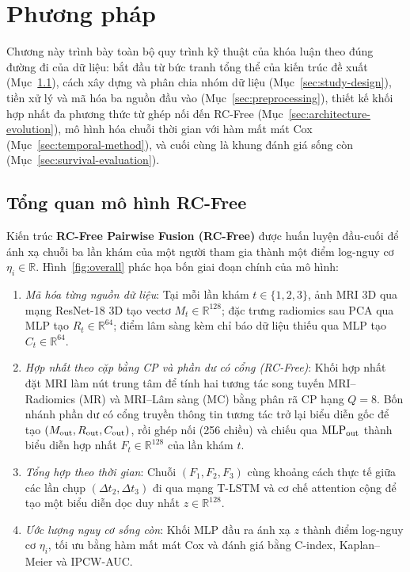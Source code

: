\chapter{Phương pháp}
\label{chap:method}

Chương này trình bày toàn bộ quy trình kỹ thuật của khóa luận theo đúng đường đi của dữ liệu: bắt đầu từ bức tranh tổng thể của kiến trúc đề xuất (Mục~\ref{sec:final-pipeline}), cách xây dựng và phân chia nhóm dữ liệu (Mục~\ref{sec:study-design}), tiền xử lý và mã hóa ba nguồn đầu vào (Mục~\ref{sec:preprocessing}), thiết kế khối hợp nhất đa phương thức từ ghép nối đến RC-Free (Mục~\ref{sec:architecture-evolution}), mô hình hóa chuỗi thời gian với hàm mất mát Cox (Mục~\ref{sec:temporal-method}), và cuối cùng là khung đánh giá sống còn (Mục~\ref{sec:survival-evaluation}).

\section{Tổng quan mô hình RC-Free}
\label{sec:final-pipeline}
Kiến trúc \textbf{RC-Free Pairwise Fusion (RC-Free)} được huấn luyện đầu-cuối để ánh xạ chuỗi ba lần khám của một người tham gia thành một điểm log-nguy cơ $\eta_i \in \mathbb R$. Hình~\ref{fig:overall} phác họa bốn giai đoạn chính của mô hình:
\begin{enumerate}
\item \emph{Mã hóa từng nguồn dữ liệu}: Tại mỗi lần khám $t\in\{1,2,3\}$, ảnh MRI 3D qua mạng ResNet-18 3D tạo vectơ $M_t\in\mathbb R^{128}$; đặc trưng radiomics sau PCA qua MLP tạo $R_t\in\mathbb R^{64}$; điểm lâm sàng kèm chỉ báo dữ liệu thiếu qua MLP tạo $C_t\in\mathbb R^{64}$.
\item \emph{Hợp nhất theo cặp bằng CP và phần dư có cổng (RC-Free)}: Khối hợp nhất đặt MRI làm nút trung tâm để tính hai tương tác song tuyến MRI--Radiomics (MR) và MRI--Lâm sàng (MC) bằng phân rã CP hạng $Q=8$. Bốn nhánh phần dư có cổng truyền thông tin tương tác trở lại biểu diễn gốc để tạo $(M_{\rm out}, R_{\rm out}, C_{\rm out})$, rồi ghép nối (256 chiều) và chiếu qua $\operatorname{MLP}_{\rm out}$ thành biểu diễn hợp nhất $F_t\in\mathbb R^{128}$ của lần khám $t$.
\item \emph{Tổng hợp theo thời gian}: Chuỗi $(F_1, F_2, F_3)$ cùng khoảng cách thực tế giữa các lần chụp $(\Delta t_2, \Delta t_3)$ đi qua mạng T-LSTM và cơ chế attention cộng để tạo một biểu diễn dọc duy nhất $z\in\mathbb R^{128}$.
\item \emph{Ước lượng nguy cơ sống còn}: Khối MLP đầu ra ánh xạ $z$ thành điểm log-nguy cơ $\eta_i$, tối ưu bằng hàm mất mát Cox và đánh giá bằng C-index, Kaplan--Meier và IPCW-AUC.
\end{enumerate}

